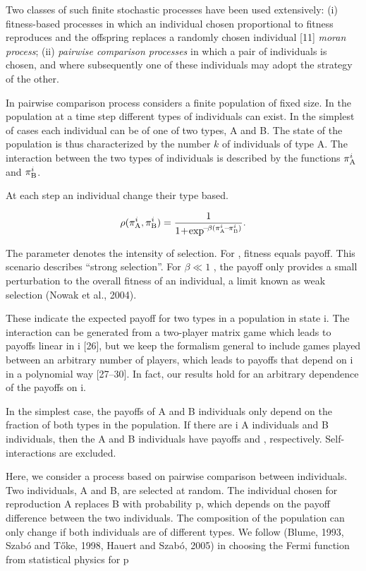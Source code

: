 \documentclass[11pt]{article}
\theoremstyle{plainCl1}
\theoremstyle{plainCl2}
\begin{document}
Two classes of such finite stochastic processes have been used extensively: (i)
fitness-based processes in which an individual chosen proportional to fitness
reproduces and the offspring replaces a randomly chosen individual [11]
\textit{moran process}; (ii) \textit{pairwise comparison processes} in which a
pair of individuals is chosen, and where subsequently one of these individuals
may adopt the strategy of the other.

In pairwise comparison process considers a finite population of fixed size. In
the population at a time step different types of individuals can exist. In the
simplest of cases each individual can be of one of two types, A and B. The state
of the population is thus characterized by the number \(k\) of individuals of
type A. The interaction between the two types of individuals is described by the
functions \(\pi _{{\rm A}}^{i}\) and $\pi _{{\rm B}}^{i}$.

At each step an individual change their type based.

\begin{equation} \label{Eq:rho}
  \rho(\pi _{{\rm A}}^{i}, \pi _{{\rm B}}^{i}) = \frac{1}{1\!+\! \exp^{\!-\!\beta (\pi _{{\rm A}}^{i}\!-\!\pi _{{\rm B}}^{i})}}.
\end{equation}

The parameter denotes the intensity of selection. For , fitness equals payoff.
This scenario describes ``strong selection''. For \(\beta \ll 1\) , the
payoff only provides a small perturbation to the overall fitness of an
individual, a limit known as weak selection (Nowak et al., 2004).

These indicate the expected payoff for two types in a population in state i. The
interaction can be generated from a two-player matrix game which leads to
payoffs linear in i [26], but we keep the formalism general to include games
played between an arbitrary number of players, which leads to payoffs that
depend on i in a polynomial way [27–30]. In fact, our results hold for an
arbitrary dependence of the payoffs on i.

In the simplest case, the payoffs of A and B individuals only depend on the
fraction of both types in the population. If there are i A individuals and B
individuals, then the A and B individuals have payoffs and , respectively.
Self-interactions are excluded.

Here, we consider a process based on pairwise comparison between individuals.
Two individuals, A and B, are selected at random. The individual chosen for
reproduction A replaces B with probability p, which depends on the payoff
difference between the two individuals. The composition of the population can
only change if both individuals are of different types. We follow (Blume, 1993,
Szabó and Tőke, 1998, Hauert and Szabó, 2005) in choosing the Fermi function
from statistical physics for p
\end{document}
